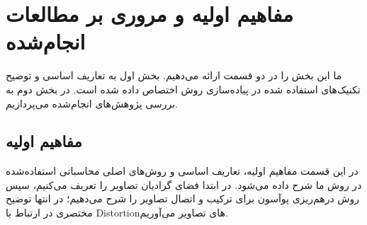 
\chapter{مفاهیم اولیه و مروری بر مطالعات انجام‌شده}
ما این بخش را در دو قسمت ارائه می‌دهیم. بخش اول به تعاریف اساسی و توضیح تکنیک‌های استفاده شده در پیاده‌سازی روش اختصاص داده شده است. در بخش دوم به بررسی پژوهش‌های انجام‌شده می‌پردازیم.
\section{مفاهیم اولیه}
در این قسمت مفاهیم اولیه، تعاریف اساسی و روش‌های اصلی محاسباتی استفاده‌شده در روش ما شرح داده می‌شود. در ابتدا فضای گرادیان تصاویر را تعریف می‌کنیم، سپس روش درهم‌ریزی پوآسون برای ترکیب و اتصال تصاویر را شرح می‌دهیم؛ در انتها توضیح مختصری در ارتباط با \gls{Distortion}‌های تصاویر می‌آوریم.
